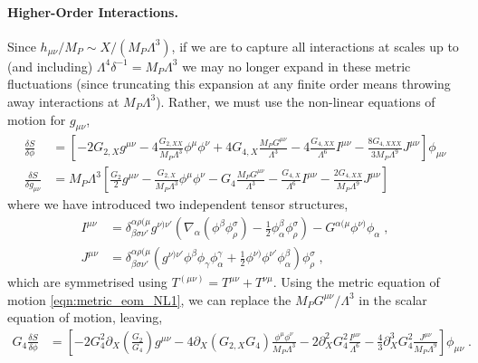 \documentclass[11pt]{article}
\begin{document}
\paragraph{Higher-Order Interactions.}
Since $h_{\mu\nu}/M_P  \sim X / (M_P \Lambda^3)$, if we are to capture all interactions at scales up to (and including) $\Lambda^4 \delta^{-1} = M_P \Lambda^3$ we may no longer expand in these metric fluctuations (since truncating this expansion at any finite order means throwing away interactions at $M_P \Lambda^3$). 
Rather, we must use the non-linear equations of motion for $g_{\mu\nu}$,
\begin{align}
 \frac{\delta S}{\delta \phi}
 &= \left[  - 2 G_{2,X} g^{\mu\nu} - 4 \frac{ G_{2,XX} }{ M_P \Lambda^3 } \phi^\mu \phi^\nu  + 4 G_{4,X} \frac{M_P G^{\mu\nu}}{\Lambda^3}    -  4 \frac{ G_{4,XX}  }{\Lambda^6} I^{\mu\nu} -  \frac{8 G_{4,XXX}}{3 M_P \Lambda^{9} }  J^{\mu\nu}   \right] \phi_{\mu\nu}   \nonumber \\
 \frac{\delta S}{\delta g_{\mu \nu} } &= M_P \Lambda^3 \left[  \frac{G_2}{2} g^{\mu\nu} - \frac{ G_{2,X} }{ M_P \Lambda^3}  \phi^\mu \phi^\nu  - G_4 \frac{ M_P  G^{\mu\nu} }{\Lambda^3}  - \frac{ G_{4,X} }{\Lambda^6} I^{\mu\nu}  - \frac{ 2 G_{4,XX} }{  M_P \Lambda^{9}}  J^{\mu\nu} \right] 
\label{eqn:metric_eom_NL1}
\end{align}
where we have introduced two independent tensor structures,
\begin{align}
 I^{\mu\nu} &=    \delta^{\alpha \rho (\mu}_{ \beta \sigma \nu'}  g^{\nu) \nu'}   \left( \nabla_\alpha \left( \phi^\beta \phi_\rho^\sigma  \right) -   \frac{1}{2} \phi_\alpha^\beta \phi_\rho^\sigma   \right)    - G^{\alpha (\mu} \phi^{\nu)} \phi_\alpha   \; ,  \nonumber \\
 J^{\mu\nu} &=   \delta^{\alpha \rho (\mu}_{ \beta \sigma \nu'} \left(   
 g^{\nu) \nu'}  \phi^\beta \phi_\gamma \phi_\alpha^\gamma
+ \frac{1}{2} \phi^{\nu)} \phi^{\nu'}    \phi_\alpha^\beta  
  \right)  \phi_\rho^\sigma    \; ,
\end{align}
which are symmetrised using $T^{(\mu\nu)} = T^{\mu\nu} + T^{\nu\mu}$. 
Using the metric equation of motion \eqref{eqn:metric_eom_NL1}, we can replace the $M_P G^{\mu\nu} / \Lambda^3$ in the scalar equation of motion, leaving,
\begin{align}
G_4 \frac{\delta S}{\delta \phi}
 &= \left[ - 2 G_4^2 \partial_X \left( \frac{G_2}{G_{4}}  \right) g^{\mu\nu} - 4  \partial_X \left( G_{2,X} G_{4} \right)  \frac{\phi^\mu \phi^\nu}{ M_P \Lambda^3} 
  -   2 \partial_X^2 G_{4}^2  \frac{  I^{\mu\nu} }{\Lambda^6} - \frac{4}{3}  \partial_X^3 G_{4}^2    \frac{  J^{\mu\nu}}{ M_P \Lambda^{9} }   \right] \phi_{\mu\nu}  \; .
  \label{eqn:phi_eom_NL}
\end{align}
\end{document}
